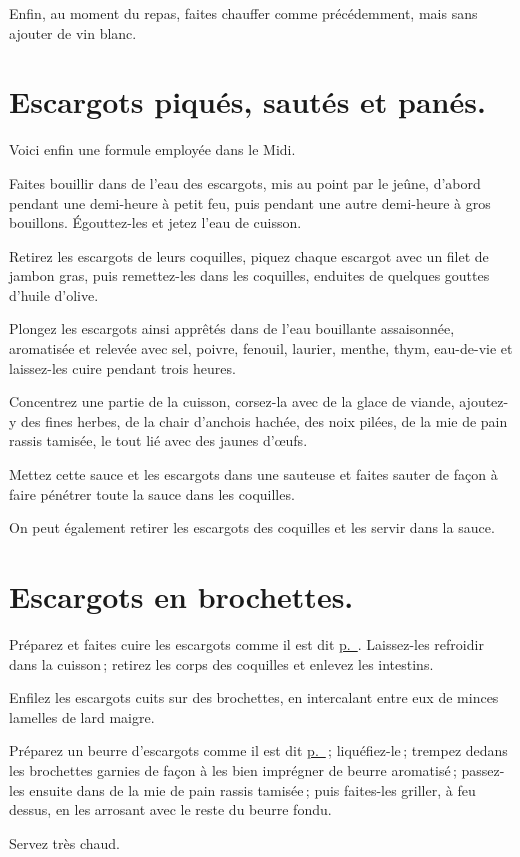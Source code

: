 Enfin, au moment du repas, faites chauffer comme précédemment, mais sans
ajouter de vin blanc.

\section*{\centering Escargots piqués, sautés et panés.}

Voici enfin une formule employée dans le Midi.

Faites bouillir dans de l’eau des escargots, mis au point par le jeûne, d'abord
pendant une demi-heure à petit feu, puis pendant une autre demi-heure à gros
bouillons. Égouttez-les et jetez l'eau de cuisson.

Retirez les escargots de leurs coquilles, piquez chaque escargot avec un filet
de jambon gras, puis remettez-les dans les coquilles, enduites de quelques
gouttes d'huile d'olive.

Plongez les escargots ainsi apprêtés dans de l'eau bouillante assaisonnée,
aromatisée et relevée avec sel, poivre, fenouil, laurier, menthe, thym,
eau-de-vie et laissez-les cuire pendant trois heures.

Concentrez une partie de la cuisson, corsez-la avec de la glace de viande,
ajoutez-y des fines herbes, de la chair d'anchois hachée, des noix pilées, de
la mie de pain rassis tamisée, le tout lié avec des jaunes d'œufs.

Mettez cette sauce et les escargots dans une sauteuse et faites sauter de façon
à faire pénétrer toute la sauce dans les coquilles.

\sk

On peut également retirer les escargots des coquilles et les servir dans la
sauce.

\section*{\centering Escargots en brochettes.}

Préparez et faites cuire les escargots comme il est dit
\hyperlink{p0304}{p. \pageref{pg0304}}. Laissez-les refroidir dans la cuisson ;
retirez les corps des coquilles et enlevez les intestins.

Enfilez les escargots cuits sur des brochettes, en intercalant entre eux de minces
lamelles de lard maigre.

Préparez un beurre d'escargots comme il est dit
\hyperlink{p0305}{p. \pageref{pg0305}} ; liquéfiez-le ; trempez dedans les
brochettes garnies de façon à les bien imprégner de beurre aromatisé ;
passez-les ensuite dans de la mie de pain rassis tamisée ; puis faites-les
griller, à feu dessus, en les arrosant avec le reste du beurre fondu.

Servez très chaud.
